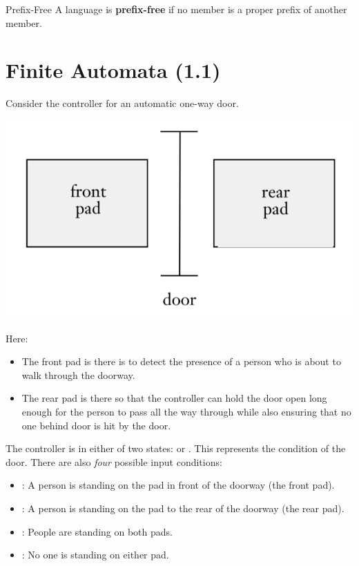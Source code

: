 \documentclass[letterpaper]{article}
\begin{document}
\begin{definition}{Prefix-Free}{}
    A language is \textbf{prefix-free} if no member is a proper prefix of another member.
\end{definition}















\newpage 
\section{Finite Automata (1.1)}
Consider the controller for an automatic one-way door.
\begin{center}
    \includegraphics[scale=0.4]{../assets/door.png}
\end{center}
Here:
\begin{itemize}
    \item The front pad is there is to detect the presence of a person who is about to walk through the doorway. 
    \item The rear pad is there so that the controller can hold the door open long enough for the person to pass all the way through while also ensuring that no one behind door is hit by the door. 
\end{itemize}
The controller is in either of two states:  or . This represents the condition of the door. There are also \emph{four} possible input conditions: 
\begin{itemize}
    \item {}: A person is standing on the pad in front of the doorway (the front pad).
    \item {}: A person is standing on the pad to the rear of the doorway (the rear pad).
    \item {}: People are standing on both pads. 
    \item {}: No one is standing on either pad.
\end{itemize}
\end{document}
